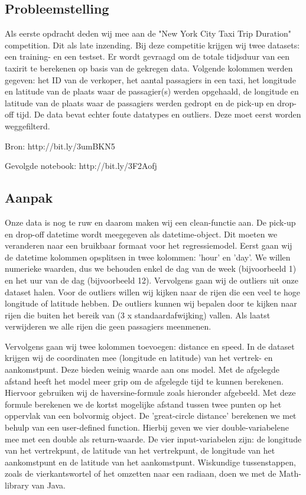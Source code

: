 \documentclass[a4paper,10pt,twoside]{report}
\begin{document}
\subsection*{Probleemstelling}

Als eerste opdracht deden wij mee aan de "New York City Taxi Trip Duration" competition. Dit als late inzending. Bij deze competitie krijgen wij twee datasets: een training- en een testset. Er wordt gevraagd om de totale tidjsduur van een taxirit te berekenen op basis van de gekregen data. Volgende kolommen werden gegeven: het ID van de verkoper, het aantal passagiers in een taxi, het longitude en latitude van de plaats waar de passagier(s) werden opgehaald, de longitude en latitude van de plaats waar de passagiers werden gedropt en de pick-up en drop-off tijd. De data bevat echter foute datatypes en outliers. Deze moet eerst worden weggefilterd.

Bron: http://bit.ly/3umBKN5

Gevolgde notebook: http://bit.ly/3F2Aofj

\subsection*{Aanpak}


Onze data is nog te ruw en daarom maken wij een clean-functie aan. De pick-up en drop-off datetime wordt meegegeven als datetime-object. Dit moeten we veranderen naar een bruikbaar formaat voor het regressiemodel. Eerst gaan wij de datetime kolommen opsplitsen in twee kolommen: 'hour' en 'day'. We willen numerieke waarden, dus we behouden enkel de dag van de week (bijvoorbeeld 1) en het uur van de dag (bijvoorbeeld 12). Vervolgens gaan wij de outliers uit onze dataset halen. Voor de outliers willen wij kijken naar de rijen die een veel te hoge longitude of latitude hebben. De outliers kunnen wij bepalen door te kijken naar rijen die buiten het bereik van (3 x standaardafwijking) vallen. Als laatst verwijderen we alle rijen die geen passagiers meenmenen. 


Vervolgens gaan wij twee kolommen toevoegen: distance en speed. In de dataset krijgen wij de coordinaten mee (longitude en latitude) van het vertrek- en aankomstpunt. Deze bieden weinig waarde aan ons model. Met de afgelegde afstand heeft het model meer grip om de afgelegde tijd te kunnen berekenen. Hiervoor gebruiken wij de haversine-formule zoals hieronder afgebeeld. Met deze formule berekenen we de kortst mogelijke afstand tussen twee punten op het oppervlak van een bolvormig object. De 'great-circle distance' berekenen we met behulp van een user-defined function. Hierbij geven we vier double-variabelene mee met een double als return-waarde. De vier input-variabelen zijn: de longitude van het vertrekpunt, de latitude van het vertrekpunt, de longitude van het aankomstpunt en de latitude van het aankomstpunt. Wiskundige tussenstappen, zoals de vierkantswortel of het omzetten naar een radiaan, doen we met de Math-library van Java.
\end{document}

